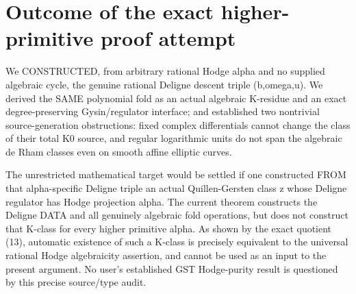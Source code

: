 \documentclass[11pt]{article}
\begin{document}
\section{Outcome of the exact higher-primitive proof attempt}
We CONSTRUCTED, from arbitrary rational Hodge alpha
and no supplied algebraic cycle, the genuine rational
Deligne descent triple (b,omega,u).
We derived the SAME polynomial fold as an actual
algebraic K-residue and an exact degree-preserving
Gysin/regulator interface; and established two
nontrivial source-generation obstructions:
fixed complex differentials cannot change
the class of their total K0 source, and
regular logarithmic units do not span
the algebraic de Rham classes even on
smooth affine elliptic curves.

The unrestricted mathematical target would be
settled if one constructed FROM that alpha-specific
Deligne triple an actual Quillen-Gersten class z
whose Deligne regulator has Hodge projection alpha.
The current theorem constructs the Deligne DATA
and all genuinely algebraic fold operations, but
does not construct that K-class for every higher
primitive alpha. As shown by the exact quotient
(13), automatic existence of such a K-class is
precisely equivalent to the universal rational
Hodge algebraicity assertion, and cannot be used
as an input to the present argument.
No user's established GST Hodge-purity result is
questioned by this precise source/type audit.
\end{document}
